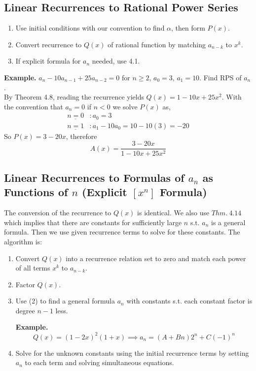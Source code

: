 \documentclass[11pt]{article}
\newenvironment{eg}[1]{
\begin{tcolorbox}[colback = white!15, arc=0pt,outer arc=0pt, colframe = black]
{\color{black} \textbf{Example.} #1} \\[5pt]
}
{
\end{tcolorbox}
}
\newcommand{\lstspacing}{\setlength\itemsep{1pt}}
\begin{document}
\subsection{Linear Recurrences to Rational Power Series}
\begin{enumerate}[(1)]
\lstspacing
    \item Use initial conditions with our convention to find $\alpha$, then form $P(x)$.
    \item Convert recurrence to $Q(x)$ of rational function by matching $a_{n - k}$ to $x^k$. 
    \item If explicit formula for ${a_n}$ needed, use 4.1.
\end{enumerate}
\begin{eg}{$a_n - 10a_{n-1}+25a_{n-2}=0$ for $n \geq 2$, $a_0 =3$, $a_1 = 10$. Find RPS of $a_n$. }
By Theorem 4.8, reading the recurrence yields $Q(x) = 1 - 10x + 25x^2$. With the convention that $a_n = 0$ if $n < 0$ we solve $P(x)$ as, 
\begin{align*}
    \underline{n = 0} &: a_0 = 3\\
    \underline{n = 1} &: a_1 - 10a_0 = 10 - 10(3) = -20
\end{align*}
So $P(x) = 3 -20x$, therefore $$A(x) = \frac{3-20x}{1-10x+25x^2}$$
\end{eg}

\subsection{Linear Recurrences to Formulas of $a_n$ as Functions of $n$ (Explicit $[x^n]$ Formula)}
The conversion of the recurrence to $Q(x)$ is identical. We also use $Thm. \: 4.14$ which implies that there are constants for sufficiently large $n$ s.t. $a_n$ is a general formula. Then we use given recurrence terms to solve for these constants. The algorithm is:
\begin{enumerate}[(1)]
\lstspacing
    \item Convert $Q(x)$ into a recurrence relation set to zero and match each power of all terms $x^k$ to $a_{n - k}$. 
    \item Factor $Q(x)$. 
    \item Use (2) to find a general formula $a_n$ with constants s.t. each constant factor is degree $n - 1$ less. 
    \begin{eg}{}
    \vspace{-25pt}
     $$Q(x) = (1-2x)^2(1+x) \implies a_n = (A+Bn)2^n + C(-1)^n$$
    \end{eg}
    \item Solve for the unknown constants using the initial recurrence terms by setting $a_n$ to each term and solving simultaneous equations. 
\end{enumerate} 
\end{document}
